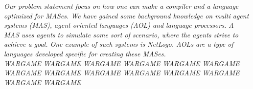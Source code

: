 \vspace{30pt}

\textit{Our problem statement focus on how one can make a compiler and a language optimized for MASes. We have gained some background knowledge on multi agent systems (MAS), agent oriented languages (AOL) and language processors. A MAS uses agents to simulate some sort of scenario, where the agents strive to achieve a goal. One example of such systems is NetLogo\cite{misc:netlogo}. AOLs are a type of languages developed specific for creating these MASes.\\ \indent
WARGAME WARGAME WARGAME WARGAME WARGAME WARGAME WARGAME WARGAME WARGAME WARGAME WARGAME WARGAME WARGAME WARGAME}